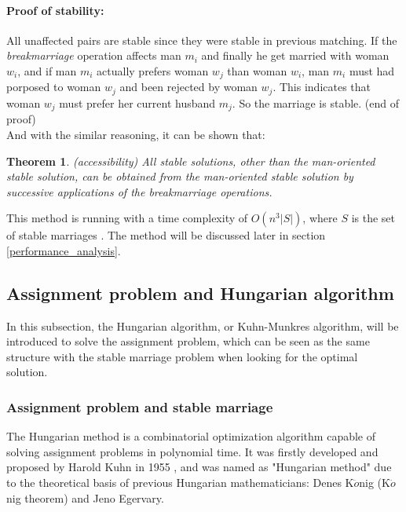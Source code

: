 \documentclass[14pt]{extarticle}
\newtheorem{theorem}{Theorem}
\begin{document}
\paragraph{Proof of stability:} All unaffected pairs are stable since they were stable in previous matching.
If the {\it breakmarriage} operation affects man $m_i$ and finally he get married with woman $w_i$, and if man $m_i$ actually prefers woman $w_j$ than woman $w_i$,
man $m_i$ must had porposed to woman $w_j$ and been rejected by woman $w_j$.
This indicates that woman $w_j$ must prefer her current husband $m_j$.
So the marriage is stable. (end of proof)\\

And with the similar reasoning, it can be shown that\cite{physicist}:

\begin{theorem}
  (accessibility)
  All stable solutions, other than the man-oriented stable solution, can be obtained from the man-oriented stable solution by successive applications of the breakmarriage operations. \cite{McVitie&Wilson}
\end{theorem}

This method is running with a time complexity of $O(n^3 \lvert S \rvert)$, where $S$ is the set of stable marriages \cite{physicist}.
The method will be discussed later in section \ref{performance_analysis}.

\subsection{Assignment problem and Hungarian algorithm} \label{hungarian}

In this subsection, the Hungarian algorithm, or Kuhn-Munkres algorithm, will be introduced to solve the assignment problem,
which can be seen as the same structure with the stable marriage problem when looking for the optimal solution.

\subsubsection{Assignment problem and stable marriage} \label{assignment problem}

The Hungarian method is a combinatorial optimization algorithm capable of solving assignment problems in polynomial time. 
It was firstly developed and proposed by Harold Kuhn in 1955 \cite{Kuhn1955}, 
and was named as "Hungarian method" due to the theoretical basis of previous Hungarian mathematicians: Denes K$\ddot{o}$nig (K$\ddot{o}$nig theorem) and Jeno Egervary.
\end{document}
